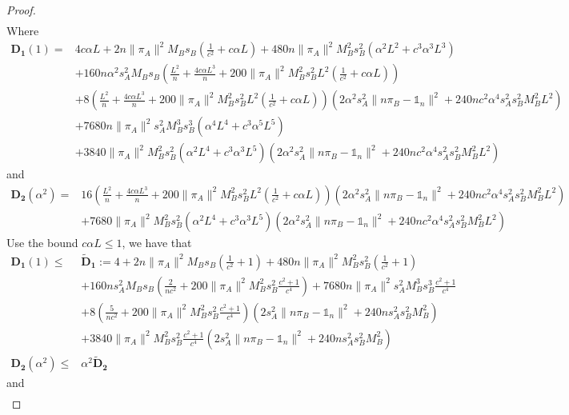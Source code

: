 \documentclass{article}
\newcommand{\norm}[1]{\| #1 \|}
\newcommand{\one}{\mathds{1}_n}
\begin{document}
\begin{proof}
\begin{align*}
  \end{align*}
  Where 
  \begin{align*}
    \mathbf{D_1}(1)=&4c\alpha L+2n\norm{\pi_A}^2M_Bs_B\left(\frac{1}{c^2}+c\alpha L\right)+480n\norm{\pi_A}^2M_B^2s_B^2\left(\alpha^2L^2+c^3\alpha^3 L^3\right)\\
    &+160n\alpha^2s_A^2M_Bs_B\left(\frac{L^2}{n}+\frac{4c\alpha L^3}{n}+200\norm{\pi_A}^2M_B^2s_B^2L^2\left(\frac{1}{c^2}+c\alpha L\right)\right)\\
    &+8\left(\frac{L^2}{n}+\frac{4c\alpha L^3}{n}+200\norm{\pi_A}^2M_B^2s_B^2L^2\left(\frac{1}{c^2}+c\alpha L\right)\right)\left(2\alpha^2s_A^2\norm{n\pi_B-\one}^2+240nc^2\alpha^4s_A^2s_B^2M_B^2L^2\right)\\
    &+7680n\norm{\pi_A}^2s_A^2M_B^3s_B^3\left(\alpha^4L^4+c^3\alpha^5 L^5\right)\\
    &+3840\norm{\pi_A}^2M_B^2s_B^2\left(\alpha^2L^4+c^3\alpha^3 L^5\right)\left(2\alpha^2s_A^2\norm{n\pi_B-\one}^2+240nc^2\alpha^4s_A^2s_B^2M_B^2L^2\right)
  \end{align*}
and 
\begin{align*}
  \mathbf{D_2}(\alpha^2)=&16\left(\frac{L^2}{n}+\frac{4c\alpha L^3}{n}+200\norm{\pi_A}^2M_B^2s_B^2L^2\left(\frac{1}{c^2}+c\alpha L\right)\right)\left(2\alpha^2s_A^2\norm{n\pi_B-\one}^2+240nc^2\alpha^4s_A^2s_B^2M_B^2L^2\right) \\
  &+7680\norm{\pi_A}^2M_B^2s_B^2\left(\alpha^2L^4+c^3\alpha^3 L^5\right)\left(2\alpha^2s_A^2\norm{n\pi_B-\one}^2+240nc^2\alpha^4s_A^2s_B^2M_B^2L^2\right) 
\end{align*}
Use the bound $c\alpha L\leq 1$, we have that
\begin{align*}
\mathbf{D_1}(1)\leq &\mathbf{\tilde{D}_1}:=4+2n\norm{\pi_A}^2M_Bs_B\left(\frac{1}{c^2}+1\right)+480n\norm{\pi_A}^2M_B^2s_B^2\left(\frac{1}{c^2}+1\right)\\
    &+160ns_A^2M_Bs_B\left(\frac{2}{nc^2}+200\norm{\pi_A}^2M_B^2s_B^2\frac{c^2+1}{c^4}\right)+7680n\norm{\pi_A}^2s_A^2M_B^3s_B^3\frac{c^2+1}{c^4}\\
    &+8\left(\frac{5}{nc^2}+200\norm{\pi_A}^2M_B^2s_B^2\frac{c^2+1}{c^4}\right)\left(2s_A^2\norm{n\pi_B-\one}^2+240ns_A^2s_B^2M_B^2\right)\\
    &+3840\norm{\pi_A}^2M_B^2s_B^2\frac{c^2+1}{c^4}\left(2s_A^2\norm{n\pi_B-\one}^2+240ns_A^2s_B^2M_B^2\right)\\
\mathbf{D_2}(\alpha^2)\leq &\alpha^2 \mathbf{\tilde{D}_2}
\end{align*}
and 
\begin{align*}

\end{align*}
\end{proof}
\end{document}
